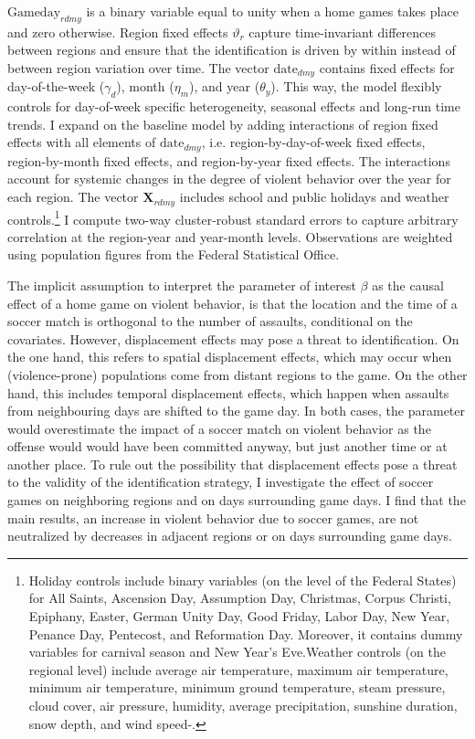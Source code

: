 \documentclass[11pt, a4paper]{article} %
\begin{document}
$\text{Gameday}_{rdmy}$ is a binary variable equal to unity when a home games takes place and zero otherwise. Region fixed effects $\vartheta_r$ capture time-invariant differences between regions and ensure that the identification is driven by within instead of between region variation over time. The vector $\text{date}_{dmy}$ contains fixed effects for day-of-the-week ($\gamma_d$), month ($\eta_m$), and year ($\theta_y$). This way, the model flexibly controls for day-of-week specific heterogeneity, seasonal effects and long-run time trends. I expand on the baseline model by adding interactions of region fixed effects with all elements of $\text{date}_{dmy}$, i.e. region-by-day-of-week fixed effects, region-by-month fixed effects, and region-by-year fixed effects. The interactions account for systemic changes in the degree of violent behavior over the year for each region. The vector $\mathbf{X}_{rdmy}$ includes school and public holidays and weather controls.\footnote{Holiday controls include binary variables (on the level of the Federal States) for All Saints, Ascension Day, Assumption Day, Christmas, Corpus Christi, Epiphany, Easter, German Unity Day, Good Friday, Labor Day, New Year, Penance Day, Pentecost, and Reformation Day. Moreover, it contains dummy variables for carnival season and New Year's Eve.\newline Weather controls (on the regional level) include average air temperature, maximum air temperature, minimum air temperature, minimum ground temperature, steam pressure, cloud cover, air pressure, humidity, average precipitation, sunshine duration, snow depth, and wind speed-.} I compute two-way cluster-robust standard errors to capture arbitrary correlation at the region-year and year-month levels. Observations are weighted using population figures from the Federal Statistical Office.


The implicit assumption to interpret the parameter of interest $\beta$ as the causal effect of a home game on violent behavior, is that the location and the time of a soccer match is orthogonal to the number of assaults, conditional on the covariates. However, displacement effects may pose a threat to identification. On the one hand, this refers to spatial displacement effects, which may occur when (violence-prone) populations come from distant regions to the game. On the other hand, this includes temporal displacement effects, which happen when assaults from neighbouring days are shifted to the game day. In both cases, the parameter would overestimate the impact of a soccer match on violent behavior as the offense would would have been committed anyway, but just another time or at another place. To rule out the possibility that displacement effects pose a threat to the validity of the identification strategy, I investigate the effect of soccer games on neighboring regions and on days surrounding game days. I find that the main results, an increase in violent behavior due to soccer games, are not neutralized by decreases in adjacent regions or on days surrounding game days.
\end{document}
